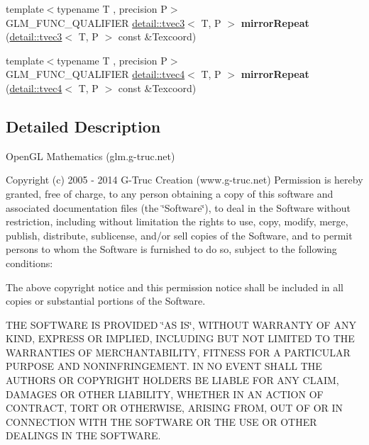 \begin{DoxyCompactItemize}
\item 
{\footnotesize template$<$typename T , precision P$>$ }\\G\+L\+M\+\_\+\+F\+U\+N\+C\+\_\+\+Q\+U\+A\+L\+I\+F\+I\+ER \hyperlink{structglm_1_1detail_1_1tvec3}{detail\+::tvec3}$<$ T, P $>$ {\bfseries mirror\+Repeat} (\hyperlink{structglm_1_1detail_1_1tvec3}{detail\+::tvec3}$<$ T, P $>$ const \&Texcoord)\hypertarget{namespaceglm_aa586893a109d75e6f0421841832548aa}{}\label{namespaceglm_aa586893a109d75e6f0421841832548aa}

\item 
{\footnotesize template$<$typename T , precision P$>$ }\\G\+L\+M\+\_\+\+F\+U\+N\+C\+\_\+\+Q\+U\+A\+L\+I\+F\+I\+ER \hyperlink{structglm_1_1detail_1_1tvec4}{detail\+::tvec4}$<$ T, P $>$ {\bfseries mirror\+Repeat} (\hyperlink{structglm_1_1detail_1_1tvec4}{detail\+::tvec4}$<$ T, P $>$ const \&Texcoord)\hypertarget{namespaceglm_afcb197155bb9ff8d767cd57b540836b1}{}\label{namespaceglm_afcb197155bb9ff8d767cd57b540836b1}

\end{DoxyCompactItemize}


\subsection{Detailed Description}
Open\+GL Mathematics (glm.\+g-\/truc.\+net)

Copyright (c) 2005 -\/ 2014 G-\/\+Truc Creation (www.\+g-\/truc.\+net) Permission is hereby granted, free of charge, to any person obtaining a copy of this software and associated documentation files (the \char`\"{}\+Software\char`\"{}), to deal in the Software without restriction, including without limitation the rights to use, copy, modify, merge, publish, distribute, sublicense, and/or sell copies of the Software, and to permit persons to whom the Software is furnished to do so, subject to the following conditions\+:

The above copyright notice and this permission notice shall be included in all copies or substantial portions of the Software.

T\+HE S\+O\+F\+T\+W\+A\+RE IS P\+R\+O\+V\+I\+D\+ED \char`\"{}\+A\+S I\+S\char`\"{}, W\+I\+T\+H\+O\+UT W\+A\+R\+R\+A\+N\+TY OF A\+NY K\+I\+ND, E\+X\+P\+R\+E\+SS OR I\+M\+P\+L\+I\+ED, I\+N\+C\+L\+U\+D\+I\+NG B\+UT N\+OT L\+I\+M\+I\+T\+ED TO T\+HE W\+A\+R\+R\+A\+N\+T\+I\+ES OF M\+E\+R\+C\+H\+A\+N\+T\+A\+B\+I\+L\+I\+TY, F\+I\+T\+N\+E\+SS F\+OR A P\+A\+R\+T\+I\+C\+U\+L\+AR P\+U\+R\+P\+O\+SE A\+ND N\+O\+N\+I\+N\+F\+R\+I\+N\+G\+E\+M\+E\+NT. IN NO E\+V\+E\+NT S\+H\+A\+LL T\+HE A\+U\+T\+H\+O\+RS OR C\+O\+P\+Y\+R\+I\+G\+HT H\+O\+L\+D\+E\+RS BE L\+I\+A\+B\+LE F\+OR A\+NY C\+L\+A\+IM, D\+A\+M\+A\+G\+ES OR O\+T\+H\+ER L\+I\+A\+B\+I\+L\+I\+TY, W\+H\+E\+T\+H\+ER IN AN A\+C\+T\+I\+ON OF C\+O\+N\+T\+R\+A\+CT, T\+O\+RT OR O\+T\+H\+E\+R\+W\+I\+SE, A\+R\+I\+S\+I\+NG F\+R\+OM, O\+UT OF OR IN C\+O\+N\+N\+E\+C\+T\+I\+ON W\+I\+TH T\+HE S\+O\+F\+T\+W\+A\+RE OR T\+HE U\+SE OR O\+T\+H\+ER D\+E\+A\+L\+I\+N\+GS IN T\+HE S\+O\+F\+T\+W\+A\+RE. 

